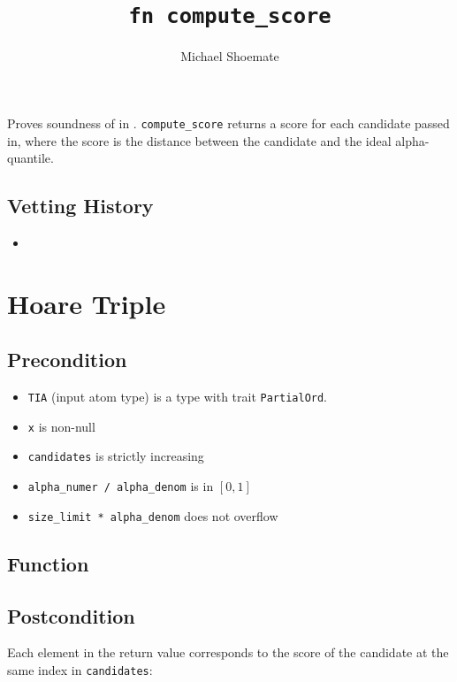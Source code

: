 \documentclass{article}
\title{\texttt{fn compute\_score}}
\author{Michael Shoemate}
\begin{document}
\maketitle


\contrib

Proves soundness of 
in .
\texttt{compute\_score} returns a score for each candidate passed in,
where the score is the distance between the candidate and the ideal alpha-quantile.

\subsection*{Vetting History}
\begin{itemize}
    \item {}
\end{itemize}

\section{Hoare Triple}
\subsection*{Precondition}
\begin{itemize}
    \item \texttt{TIA} (input atom type) is a type with trait \texttt{PartialOrd}.
    \item \texttt{x} is non-null
    \item \texttt{candidates} is strictly increasing
    \item \texttt{alpha\_numer / alpha\_denom} is in $[0, 1]$
    \item \texttt{size\_limit * alpha\_denom} does not overflow
\end{itemize}


\subsection*{Function}
\label{sec:python-pseudocode}



\subsection*{Postcondition}
Each element in the return value corresponds to the score of the candidate at the same index in \texttt{candidates}:
\end{document}
